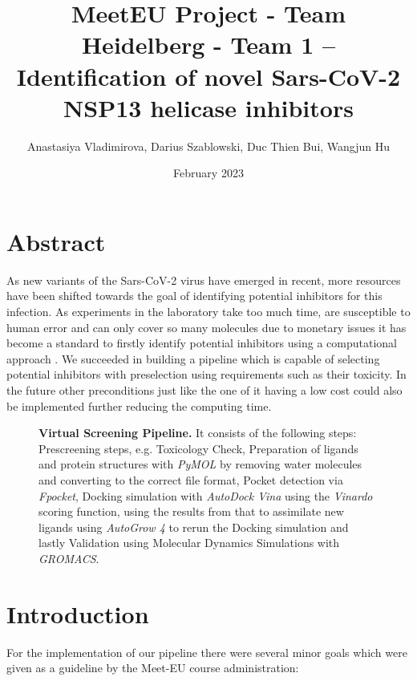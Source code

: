 \documentclass[11pt, letterpaper, titlepage]{article}
\title{MeetEU Project - Team Heidelberg - Team 1 -- \\ Identification of novel Sars-CoV-2 NSP13 helicase inhibitors}
\author{Anastasiya Vladimirova, Darius Szablowski, Duc Thien Bui, Wangjun Hu}
\date{February 2023}
\begin{document}
\maketitle

\section{Abstract} 

As new variants of the Sars-CoV-2 virus have emerged in recent, more resources have been shifted towards the goal of identifying potential inhibitors for this infection. As experiments in the laboratory take too much time, are susceptible to human error and can only cover so many molecules due to monetary issues it has become a standard to firstly identify potential inhibitors using a computational approach \cite{Luttens2022}.  
\newline \newline
We succeeded in building a pipeline which is capable of selecting potential inhibitors with preselection using requirements such as their toxicity. In the future other preconditions just like the one of it having a low cost could also be implemented further reducing the computing time. 

\begin{figure}[h!]

  

\caption{\textbf{Virtual Screening Pipeline.} It consists of the following steps: Prescreening steps, e.g. Toxicology Check, Preparation of ligands and protein structures with \emph{PyMOL} by removing water molecules and converting to the correct file format, Pocket detection via \emph{Fpocket}, Docking simulation with \emph{AutoDock Vina} using the \emph{Vinardo} scoring function, using the results from that to assimilate new ligands using \emph{AutoGrow 4} to rerun the Docking simulation and lastly Validation using Molecular Dynamics Simulations with \emph{GROMACS}.} 

\label{pipeline} 

\end{figure} 
\FloatBarrier

\section{Introduction}
For the implementation of our pipeline there were several minor goals which were given as a guideline by the Meet-EU course administration: 
\end{document}
